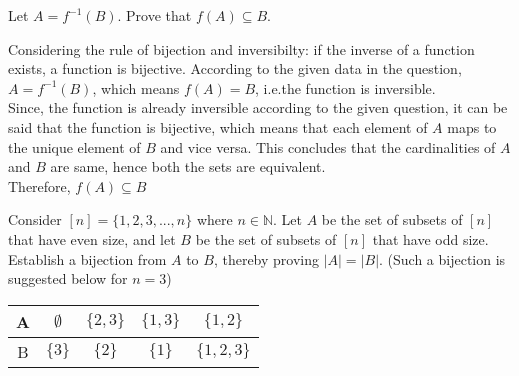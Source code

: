 \documentclass[addpoints]{exam}
\begin{document}
\begin{questions}
\question[15] Let $A = f^{-1}(B)$. Prove that $f(A) \subseteq B$.
  \begin{solution}
    Considering the rule of bijection and inversibilty: if the inverse of a function exists, a function is bijective. According to the given data in the question, $A = f^{-1}(B)$, which means $f(A)=B$, i.e.the function is inversible.  \\
    Since, the function is already inversible according to the given question, it can be said that the function  is bijective, which means that each element of $A$ maps to the unique element of $B$ and vice versa. This concludes that the cardinalities of $A$ and $B$ are same, hence both the sets are equivalent. 
    \\
    Therefore, $f(A) \subseteq B$
    
  \end{solution}

\question[15] Consider $[n] = \{1,2,3,...,n\}$ where $n \in \mathbb{N}$. Let $A$ be the set of subsets of $[n]$ that have even size, and let $B$ be the set of subsets of $[n]$ that have odd size. Establish a bijection from $A$ to $B$, thereby proving $|A| = |B|$. (Such a bijection is suggested below for $n = 3$) 

\begin{center}

  \begin{tabular}{ |c || c | c | c |c |}
    \hline
 A & $\emptyset$ & $\{2,3\}$ & $\{1,3\}$ & $\{1,2\}$ \\ \hline
 B & $\{3\}$ & $\{2\}$ & $\{1\}$ & $\{1,2,3\}$\\\hline
\end{tabular}
\end{center}


\end{questions}
\end{document}
